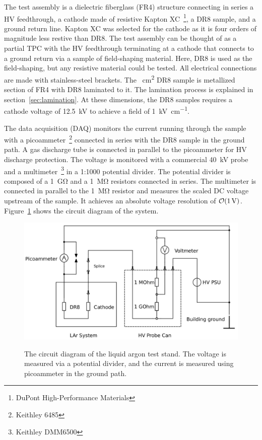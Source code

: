 \documentclass[a4paper,12pt]{article}
\newcommand{\DR}{DR8}
\begin{document}
The test assembly is a dielectric fiberglass (FR4) structure connecting in series a HV feedthrough, a cathode made of resistive Kapton XC~\footnote{DuPont High-Performance Materials}, a {\DR} sample, and a ground return line.
Kapton XC was selected for the cathode as it is four orders of magnitude less restive than {\DR}.  
The test assembly can be thought of as a partial TPC with the HV feedthrough terminating at a cathode that connects to a ground return via a sample of field-shaping material. 
Here, {\DR} is used as the field-shaping, but any resistive material could be tested.    
All electrical connections are made with stainless-steel brackets.    
The ~\unit{\centi\metre\squared} {\DR} sample is metallized section of FR4 with {\DR} laminated to it.
The lamination process is explained in section~\ref{sec:lamination}.
At these dimensions, the {\DR} samples requires a cathode voltage of \SI{12.5}{\kilo\volt} to achieve a field of \SI{1}{\kilo\volt\per\centi\metre}.    

The data acquisition (DAQ) monitors the current running through the sample with a picoammeter~\footnote{Keithley 6485} connected in series with the {\DR} sample in the ground path. 
A gas discharge tube is connected in parallel to the picoammeter for HV discharge protection. 
The voltage is monitored with a commercial \SI{40}{\kilo\volt} probe and a multimeter~\footnote{Keithley DMM6500} in a 1:1000 potential divider. 
The potential divider is composed of a \SI{1}{\giga\ohm} and a \SI{1}{\mega\ohm} resistors connected in series. 
The multimeter is connected in parallel to the \SI{1}{\mega\ohm} resistor and measures the scaled DC voltage upstream of the sample. 
It achieves an absolute voltage resolution of $\order{\SI{1}{\volt}}$.
Figure~\ref{fig:circuit} shows the circuit diagram of the system. 

\begin{figure}[ht]
	{\includegraphics[width=0.8\linewidth]{circuit.jpg}}
	\caption{The circuit diagram of the liquid argon test stand. The voltage is measured via a potential divider, and the current is measured using  picoammeter in the ground path.}
	\label{fig:circuit}
\end{figure}
\end{document}
